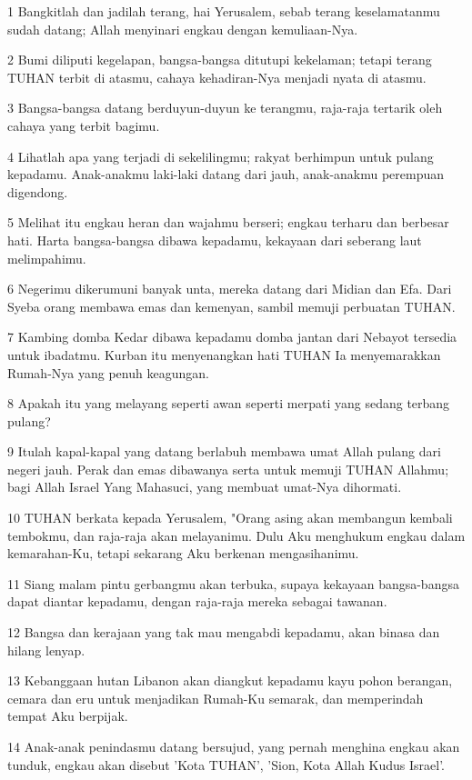 \par 1 Bangkitlah dan jadilah terang, hai Yerusalem, sebab terang keselamatanmu sudah datang; Allah menyinari engkau dengan kemuliaan-Nya.
\par 2 Bumi diliputi kegelapan, bangsa-bangsa ditutupi kekelaman; tetapi terang TUHAN terbit di atasmu, cahaya kehadiran-Nya menjadi nyata di atasmu.
\par 3 Bangsa-bangsa datang berduyun-duyun ke terangmu, raja-raja tertarik oleh cahaya yang terbit bagimu.
\par 4 Lihatlah apa yang terjadi di sekelilingmu; rakyat berhimpun untuk pulang kepadamu. Anak-anakmu laki-laki datang dari jauh, anak-anakmu perempuan digendong.
\par 5 Melihat itu engkau heran dan wajahmu berseri; engkau terharu dan berbesar hati. Harta bangsa-bangsa dibawa kepadamu, kekayaan dari seberang laut melimpahimu.
\par 6 Negerimu dikerumuni banyak unta, mereka datang dari Midian dan Efa. Dari Syeba orang membawa emas dan kemenyan, sambil memuji perbuatan TUHAN.
\par 7 Kambing domba Kedar dibawa kepadamu domba jantan dari Nebayot tersedia untuk ibadatmu. Kurban itu menyenangkan hati TUHAN Ia menyemarakkan Rumah-Nya yang penuh keagungan.
\par 8 Apakah itu yang melayang seperti awan seperti merpati yang sedang terbang pulang?
\par 9 Itulah kapal-kapal yang datang berlabuh membawa umat Allah pulang dari negeri jauh. Perak dan emas dibawanya serta untuk memuji TUHAN Allahmu; bagi Allah Israel Yang Mahasuci, yang membuat umat-Nya dihormati.
\par 10 TUHAN berkata kepada Yerusalem, "Orang asing akan membangun kembali tembokmu, dan raja-raja akan melayanimu. Dulu Aku menghukum engkau dalam kemarahan-Ku, tetapi sekarang Aku berkenan mengasihanimu.
\par 11 Siang malam pintu gerbangmu akan terbuka, supaya kekayaan bangsa-bangsa dapat diantar kepadamu, dengan raja-raja mereka sebagai tawanan.
\par 12 Bangsa dan kerajaan yang tak mau mengabdi kepadamu, akan binasa dan hilang lenyap.
\par 13 Kebanggaan hutan Libanon akan diangkut kepadamu kayu pohon berangan, cemara dan eru untuk menjadikan Rumah-Ku semarak, dan memperindah tempat Aku berpijak.
\par 14 Anak-anak penindasmu datang bersujud, yang pernah menghina engkau akan tunduk, engkau akan disebut 'Kota TUHAN', 'Sion, Kota Allah Kudus Israel'.
